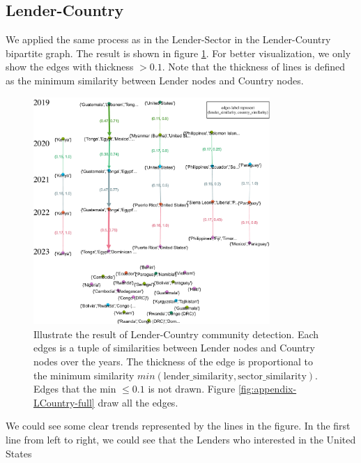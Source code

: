 \subsection{Lender-Country}

We applied the same process as in the Lender-Sector in the Lender-Country bipartite graph.
The result is shown in figure \ref{fig:LCountry}.
For better visualization, we only show the edges with thickness $> 0.1$.
Note that the thickness of lines is defined as the minimum similarity between Lender nodes and Country nodes.

\begin{figure}[H]
	\centering
	\includegraphics[width=0.8\textwidth]{images/LCountry.pdf}
	\caption[Illustrate the result of Lender-Country community detection]{
		Illustrate the result of Lender-Country community detection.
		Each edges is a tuple of similarities between Lender nodes and Country nodes over the years.
		The thickness of the edge is proportional to the minimum similarity $min(\text{lender\_similarity}, \text{sector\_similarity})$.
		Edges that the min $\le 0.1$ is not drawn.
		Figure \ref{fig:appendix-LCountry-full} draw all the edges.
	}
	\label{fig:LCountry}
\end{figure}

We could see some clear trends represented by the lines in the figure.
In the first line from left to right, we could see that the Lenders who interested in the United States



